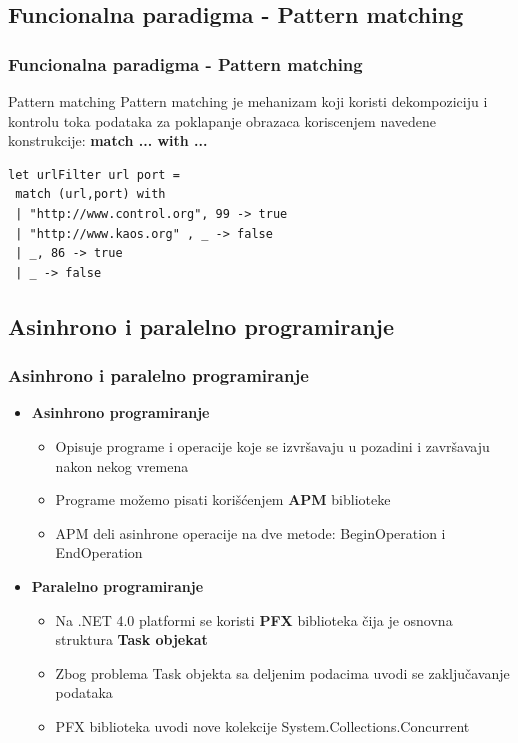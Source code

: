 \documentclass{beamer}
\begin{document}
\subsection*{Funcionalna paradigma - Pattern matching}  
\begin{frame}[fragile]
\frametitle{Funcionalna paradigma - Pattern matching}


\begin{block}{Pattern matching}
Pattern matching je mehanizam koji koristi dekompoziciju i kontrolu toka podataka za poklapanje obrazaca koriscenjem navedene konstrukcije:
\textbf{ match ... with ...}
\end{block}
\begin{lstlisting}
let urlFilter url port =
 match (url,port) with
 | "http://www.control.org", 99 -> true
 | "http://www.kaos.org" , _ -> false
 | _, 86 -> true
 | _ -> false
\end{lstlisting} 

\end{frame}

\subsection*{Asinhrono i paralelno programiranje}
\begin{frame}[fragile]
\frametitle{Asinhrono i paralelno programiranje}

\begin{itemize}
\item \textbf{Asinhrono programiranje}
\begin{itemize}
	\item Opisuje programe i operacije koje se izvršavaju u pozadini i završavaju nakon nekog vremena
	\item Programe možemo pisati korišćenjem \textbf{APM} biblioteke
	\item APM deli asinhrone operacije na dve metode: BeginOperation i EndOperation
\end{itemize}

\item \textbf{Paralelno programiranje}
\begin{itemize}
	\item Na .NET 4.0 platformi se koristi \textbf{PFX} biblioteka čija je osnovna struktura \textbf{Task objekat}
	\item Zbog problema Task objekta sa deljenim podacima uvodi se zaključavanje podataka
	\item PFX biblioteka uvodi nove kolekcije System.Collections.Concurrent	
\end{itemize}
\end{itemize}



\end{frame}
\end{document}
